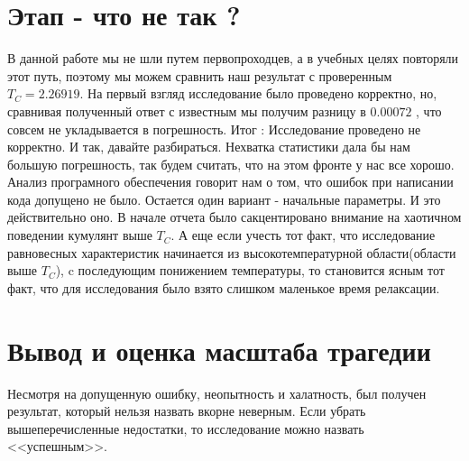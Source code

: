 \documentclass[12pt,a4paper]{article}
\begin{document}
	\section{Этап - что не так ?}
	В данной работе мы не шли путем первопроходцев, а в учебных целях повторяли этот путь, поэтому мы можем сравнить наш результат с проверенным $T_C = 2.26919$. На первый взгляд исследование было проведено корректно, но, сравнивая полученный ответ с известным мы получим разницу в $0.00072$ , что совсем не укладывается в погрешность. Итог : Исследование проведено не корректно.
	И так, давайте разбираться.
	Нехватка статистики дала бы нам большую погрешность, так будем считать, что на этом фронте у нас все хорошо.
	Анализ програмного обеспечения говорит нам о том, что ошибок при написании кода допущено не было.
	Остается один вариант - начальные параметры. И это действительно оно.
	В начале отчета было сакцентировано внимание на хаотичном поведении кумулянт выше $T_C$. А еще если учесть тот факт, что исследование равновесных характеристик начинается из высокотемпературной области(области выше $T_C$), c последующим понижением температуры, то становится ясным тот факт, что для исследования было взято слишком маленькое время релаксации.
	 
	\section{Вывод и оценка масштаба трагедии}
	Несмотря на допущенную ошибку, неопытность и халатность, был получен результат, который нельзя назвать вкорне неверным.
	Если убрать вышеперечисленные недостатки, то исследование можно назвать <<успешным>>.
	

\newpage
\end{document}
